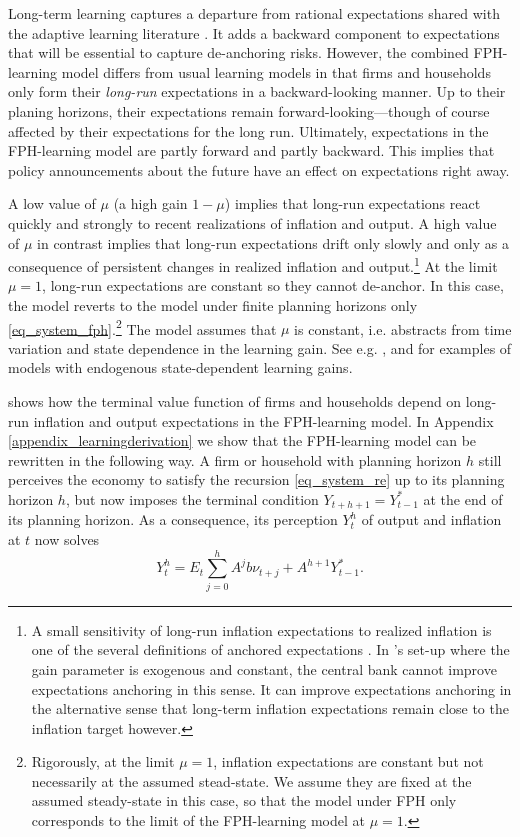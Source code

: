 \documentclass{article}
\begin{document}
Long-term learning captures a departure from rational expectations shared with the adaptive learning literature \citep{BullardMitra2002, EvansHonkapohja2003, Preston2005}. It adds a backward component to expectations that will be essential to capture de-anchoring risks. However, the combined FPH-learning model differs from usual learning models in that firms and households only form their \emph{long-run} expectations in a backward-looking manner. Up to their planing horizons, their expectations remain forward-looking---though of course affected by their expectations for the long run. Ultimately, expectations in the FPH-learning model are partly forward and partly backward. This implies that policy announcements about the future have an effect on expectations right away.

A low value of $\mu$ (a high gain $1-\mu$) implies that long-run expectations react quickly and strongly to recent realizations of inflation and output. A high value of $\mu$ in contrast implies that long-run expectations drift only slowly and only as a consequence of persistent changes in realized inflation and output.\footnote{A small sensitivity of long-run inflation expectations to realized inflation is one of the several definitions of anchored expectations \citep[][Section 2]{Kumaretal2015}. In \cite{Woodford2019}'s set-up where the gain parameter is exogenous and constant, the central bank cannot improve expectations anchoring in this sense. It can improve expectations anchoring in the alternative sense that long-term inflation expectations remain close to the inflation target however.} At the limit $\mu=1$, long-run expectations are constant so they cannot de-anchor. In this case, the model reverts to the model under finite planning horizons only \eqref{eq_system_fph}.\footnote{Rigorously, at the limit $\mu=1$, inflation expectations are constant but not necessarily at the assumed stead-state. We assume they are fixed at the assumed steady-state in this case, so that the model under FPH only corresponds to the limit of the FPH-learning model at $\mu=1$.} The model assumes that $\mu$ is constant, i.e. abstracts from time variation and state dependence in the learning gain. See e.g. \cite{Milani2014}, \cite{Carvalhoetal2023} and \cite{Gati2022} for examples of models with endogenous state-dependent learning gains.

\cite{Woodford2019} shows how the terminal value function of firms and households depend on long-run inflation and output expectations in the FPH-learning model. In Appendix \ref{appendix_learningderivation} we show that the FPH-learning model can be rewritten in the following way. A firm or household with planning horizon $h$ still perceives the economy to satisfy the recursion \eqref{eq_system_re} up to its planning horizon $h$, but now imposes the terminal condition $Y_{t+h+1}=Y_{t-1}^{*}$ at the end of its planning horizon. As a consequence, its perception $Y_t^h$ of output and inflation at $t$ now solves
\begin{equation}
Y_t^h =  E_t \sum_{j=0}^h A^j b \nu_{t+j} + A^{h+1} Y_{t-1}^{*}.\label{eq_system_fphlearning_h}
\end{equation}
\end{document}
